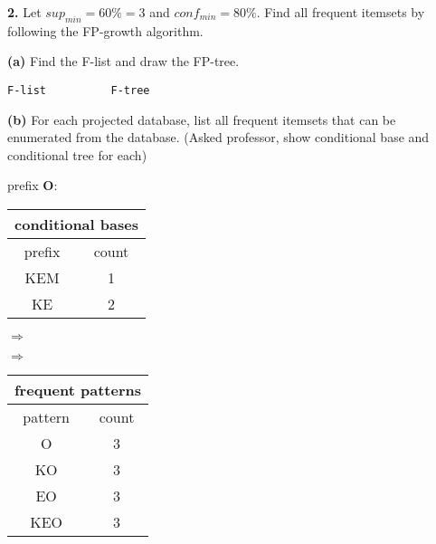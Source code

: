 \documentclass[12pt]{elsart}
\begin{document}
{\bf 2.} Let $sup_{min} = 60\% = 3$ and $conf_{min} = 80\%$. Find all frequent itemsets by following the FP-growth algorithm.

{\bf (a)} Find the F-list and draw the FP-tree.

\verb|F-list          F-tree|


\newpage

{\bf (b)} For each projected database, list all frequent itemsets that can be enumerated from the database. (Asked professor, show conditional base and conditional tree for each)

prefix {\bf O}:
\begin{tabular}{|c|c|}
  \multicolumn{2}{c}{conditional bases} \\ \hline
  prefix & count \\ \hline
  KEM & 1 \\ \hline
  KE & 2 \\
  \hline
\end{tabular}
$\Rightarrow$
$\Rightarrow$
\begin{tabular}{|c|c|}
  \multicolumn{2}{c}{frequent patterns} \\ \hline
  pattern & count \\ \hline
  O & 3 \\ \hline
  KO & 3 \\ \hline
  EO & 3 \\ \hline
  KEO & 3 \\
  \hline
\end{tabular}
\end{document}
